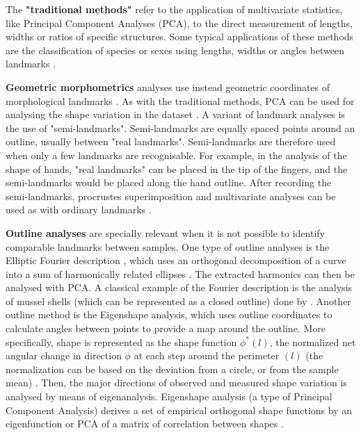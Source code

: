 The \textbf{"traditional methods"} refer to the application of multivariate statistics, like Principal Component Analyses (PCA), to the direct measurement of lengths, widths or ratios of specific structures. Some typical applications of these methods are the classification of species or sexes \citep{Jolicoeur1960} using lengths, widths or angles between landmarks \citep{Dryden1998}.

\textbf{Geometric morphometrics} analyses use instead geometric coordinates of morphological landmarks  \citep{Mitteroecker2009,zelditch2012geometric}. As with the traditional methods, PCA can be used for analysing the shape variation in the dataset \citep{Klingenberg2010}.
A variant of landmark analyses is the use of "semi-landmarks". Semi-landmarks are equally spaced points around an outline, usually between "real landmarks". Semi-landmarks are therefore used when only a few landmarks are recognisable. For example, in the analysis of the shape of hands, "real landmarks" can be placed in the tip of the fingers, and the semi-landmarks would be placed along the hand outline. After recording the semi-landmarks, procrustes superimposition and multivariate analyses can be used as with ordinary landmarks \citep{Dryden1998}.

\textbf{Outline analyses} are specially relevant when it is not possible to identify comparable landmarks between samples. 
%
One type of outline analyses is the Elliptic Fourier description \citep{Kuhl1982}, which uses an orthogonal decomposition of a curve into a sum of harmonically related ellipses \citep{Ferson1985}. The extracted harmonics can then be analysed with PCA. A classical example of the Fourier description is the analysis of mussel shells (which can be represented as a closed outline) done by \citealp{Ferson1985}.
% 
Another outline method is the Eigenshape analysis, which uses outline coordinates to calculate angles between points to provide a map around the outline. More specifically, shape is represented as the shape function $\phi^{*}(l)$, the normalized net angular change in direction $\phi$ at each step around the perimeter $(l)$ (the normalization can be based on the deviation from a circle, or from the sample mean) \citep{Lohmann1983}. Then, the major directions of observed and measured shape variation is analysed by means of
eigenanalysis. 
Eigenshape analysis (a type of Principal Component Analysis) derives a set of empirical orthogonal shape functions by an eigenfunction or PCA of a matrix of correlation between shapes \citep{Lohmann1983}.


